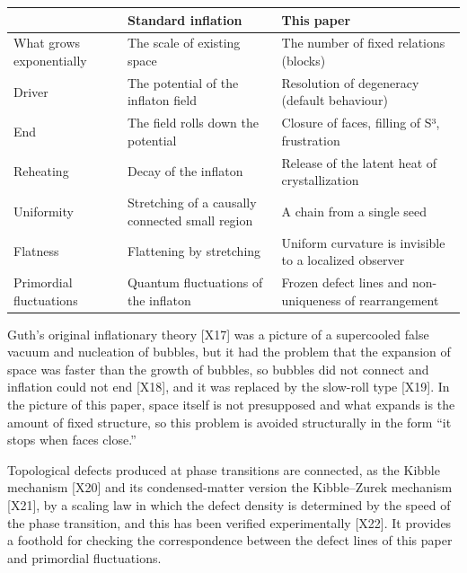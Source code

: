 \documentclass[
  a4paper,
]{article}
\newcounter{none} %
\begin{document}
{\def\LTcaptype{none} %
\begin{longtable}[]{@{}
  >{\raggedright\arraybackslash}p{}
  >{\raggedright\arraybackslash}p{}
  >{\raggedright\arraybackslash}p{}@{}}
\toprule\noalign{}
\begin{minipage}[b]{\linewidth}\raggedright
\end{minipage} & \begin{minipage}[b]{\linewidth}\raggedright
Standard inflation
\end{minipage} & \begin{minipage}[b]{\linewidth}\raggedright
This paper
\end{minipage} \\
\midrule\noalign{}
\endhead
\bottomrule\noalign{}
\endlastfoot
What grows exponentially & The scale of existing space & The number of
fixed relations (blocks) \\
Driver & The potential of the inflaton field & Resolution of degeneracy
(default behaviour) \\
End & The field rolls down the potential & Closure of faces, filling of
S³, frustration \\
Reheating & Decay of the inflaton & Release of the latent heat of
crystallization \\
Uniformity & Stretching of a causally connected small region & A chain
from a single seed \\
Flatness & Flattening by stretching & Uniform curvature is invisible to
a localized observer \\
Primordial fluctuations & Quantum fluctuations of the inflaton & Frozen
defect lines and non-uniqueness of rearrangement \\
\end{longtable}
}

Guth's original inflationary theory {[}X17{]} was a picture of a
supercooled false vacuum and nucleation of bubbles, but it had the
problem that the expansion of space was faster than the growth of
bubbles, so bubbles did not connect and inflation could not end
{[}X18{]}, and it was replaced by the slow-roll type {[}X19{]}. In the
picture of this paper, space itself is not presupposed and what expands
is the amount of fixed structure, so this problem is avoided
structurally in the form ``it stops when faces close.''

Topological defects produced at phase transitions are connected, as the
Kibble mechanism {[}X20{]} and its condensed-matter version the
Kibble--Zurek mechanism {[}X21{]}, by a scaling law in which the defect
density is determined by the speed of the phase transition, and this has
been verified experimentally {[}X22{]}. It provides a foothold for
checking the correspondence between the defect lines of this paper and
primordial fluctuations.
\end{document}
